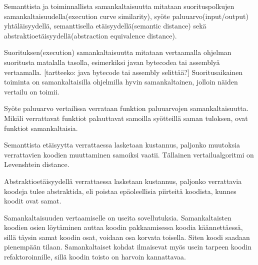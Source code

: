 \documentclass[finnish]{tktltiki2}
\theoremstyle{definition}
\theoremstyle{remark}
\begin{document}
\begin{itemize}
Semanttista ja toiminnallista samankaltaisuutta mitataan suorituspolkujen samankaltaisuudella(execution curve similarity), syöte paluuarvo(input/output) yhtäläisyydellä, semanttisella etäisyydellä(semantic distance) sekä abstraktioetäisyydellä(abstraction equivalence distance).

Suorituksen(execution) samankaltaisuutta mitataan vertaamalla ohjelman suoritusta matalalla tasolla, esimerkiksi javan bytecodea tai assemblyä vertaamalla. [tartteeko: java bytecode tai assembly selittää?] Suoritusaikainen toiminta on samankaltaisilla ohjelmilla hyvin samankaltainen, jolloin näiden vertailu on toimii.

Syöte paluuarvo vertailissa verrataan funktion paluuarvojen samankaltaisuutta. Mikäli verrattavat funktiot palauttavat samoilla syötteillä saman tuloksen, ovat funktiot samankaltaisia.

Semanttista etäisyytta verrattaessa lasketaan kustannus, paljonko muutoksia verrattavien koodien muuttaminen samoiksi vaatii. Tällainen vertailualgoritmi on Levenshtein distance.

Abstraktioetäisyydellä verrattaessa lasketaan kustannus, paljonko verrattavia koodeja tulee abstraktida, eli poistaa epäoleellisia piirteitä koodista, kunnes koodit ovat samat.
\end{itemize}

Samankaltaisuuden vertaamiselle on useita sovellutuksia. Samankaltaisten koodien osien löytäminen auttaa koodin pakkaamisessa koodia käännettäessä, sillä täysin samat koodin osat, voidaan osa korvata toisella. Siten koodi saadaan pienempään tilaan. Samankaltaiset kohdat ilmaisevat myös usein tarpeen koodin refaktoroinnille, sillä koodin toisto on harvoin kannattavaa.





%
%
% 
%







% 
\end{document}

